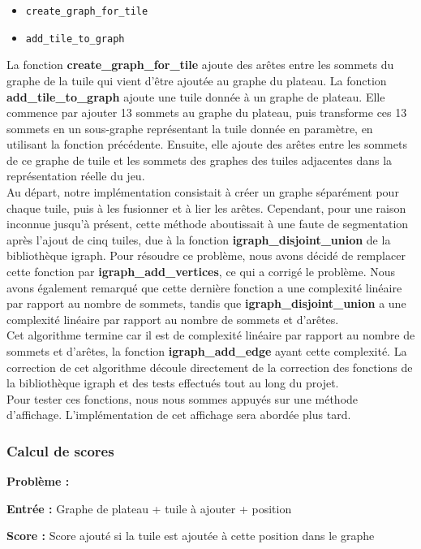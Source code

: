 \begin{itemize}
    \item \texttt{create\_graph\_for\_tile}
        \item \texttt{add\_tile\_to\_graph}
\end{itemize}
La fonction \textbf{create\_graph\_for\_tile} ajoute des arêtes entre les sommets du graphe de la tuile qui vient d'être ajoutée au graphe du plateau. La fonction \textbf{add\_tile\_to\_graph} ajoute une tuile donnée à un graphe de plateau. Elle commence par ajouter 13 sommets au graphe du plateau, puis transforme ces 13 sommets en un sous-graphe représentant la tuile donnée en paramètre, en utilisant la fonction précédente. Ensuite, elle ajoute des arêtes entre les sommets de ce graphe de tuile et les sommets des graphes des tuiles adjacentes dans la représentation réelle du jeu.\\
Au départ, notre implémentation consistait à créer un graphe séparément pour chaque tuile, puis à les fusionner et à lier les arêtes. Cependant, pour une raison inconnue jusqu'à présent, cette méthode aboutissait à une faute de segmentation après l'ajout de cinq tuiles, due à la fonction \textbf{igraph\_disjoint\_union} de la bibliothèque igraph. Pour résoudre ce problème, nous avons décidé de remplacer cette fonction par \textbf{igraph\_add\_vertices}, ce qui a corrigé le problème. Nous avons également remarqué que cette dernière fonction a une complexité linéaire par rapport au nombre de sommets, tandis que \textbf{igraph\_disjoint\_union} a une complexité linéaire par rapport au nombre de sommets et d'arêtes.\\
Cet algorithme termine car il est de complexité linéaire par rapport au nombre de sommets et d'arêtes, la fonction \textbf{igraph\_add\_edge} ayant cette complexité. La correction de cet algorithme découle directement de la correction des fonctions de la bibliothèque igraph et des tests effectués tout au long du projet.\\
Pour tester ces fonctions, nous nous sommes appuyés sur une méthode d'affichage. L'implémentation de cet affichage sera abordée plus tard.\\
\subsubsection{Calcul de scores}
\textbf{Problème :}

\textbf{Entrée :} Graphe de plateau + tuile à ajouter + position

\textbf{Score :} Score ajouté si la tuile est ajoutée à cette position dans le graphe\\

